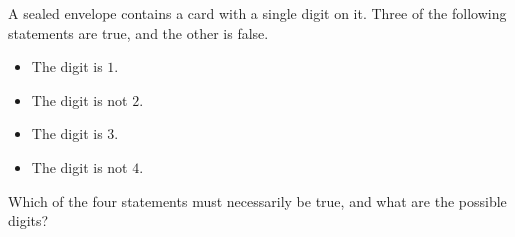 A sealed envelope contains a card with a single digit on it. Three of the following statements are true, and the other is false.
\begin{itemize}
\item[I.] The digit is $1$.
\item[II.] The digit is not $2$.
\item[III.] The digit is $3$.
\item[IV.] The digit is not $4$.
\end{itemize}
Which of the four statements must necessarily be true, and what are the possible digits?

